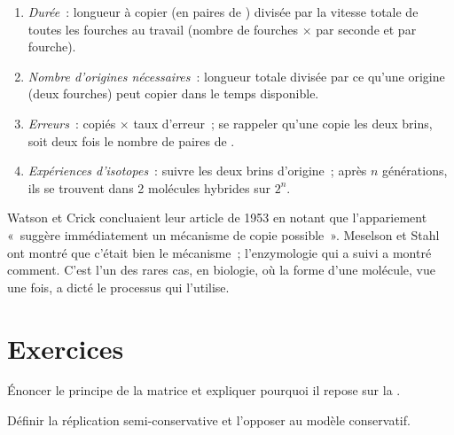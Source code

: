 \begin{method}\label{met:g11:dna-replication:calc}
\begin{enumerate}
  \item \emph{Durée}~: longueur à copier (en paires de ) divisée
        par la vitesse totale de toutes les fourches au travail
        (nombre de fourches $\times$  par seconde et par
        fourche).
  \item \emph{Nombre d'origines nécessaires}~: longueur totale divisée
        par ce qu'une origine (deux fourches) peut copier dans le temps
        disponible.
  \item \emph{Erreurs}~:  copiés $\times$ taux d'erreur~; se
        rappeler qu'une  copie les deux brins, soit deux fois le
        nombre de paires de .
  \item \emph{Expériences d'isotopes}~: suivre les deux brins
        d'origine~; après $n$ générations, ils se trouvent dans 2
        molécules hybrides sur $2^n$.
\end{enumerate}
\end{method}

\begin{remark}\label{rem:g11:dna-replication:fit}
Watson et Crick concluaient leur article de 1953 en notant que
l'appariement «~suggère immédiatement un mécanisme de copie
possible~». Meselson et Stahl ont montré que c'était bien le
mécanisme~; l'enzymologie qui a suivi a montré comment. C'est l'un des
rares cas, en biologie, où la forme d'une molécule, vue une fois, a
dicté le processus qui l'utilise.
\end{remark}

\section{Exercices}

\begin{exercise}[$\star$]\label{exo:g11:dna-replication:1}
Énoncer le principe de la matrice et expliquer pourquoi il repose sur
la .
\end{exercise}

\begin{exercise}[$\star$]\label{exo:g11:dna-replication:2}
Définir la réplication semi-conservative et l'opposer au modèle
conservatif.
\end{exercise}

